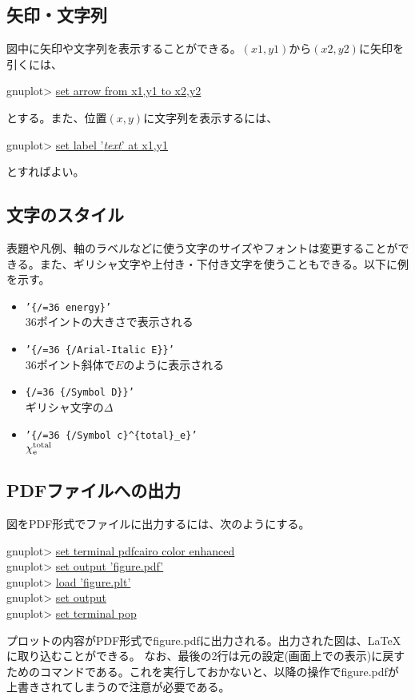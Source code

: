 \subsection{矢印・文字列}

図中に矢印や文字列を表示することができる。\((x1,y1)\)から\((x2,y2)\)に矢印を引くには、
\begin{commandline2}
    gnuplot> \underline{set arrow from x1,y1 to x2,y2}
\end{commandline2} \noindent
とする。また、位置\((x,y)\)に文字列を表示するには、
\begin{commandline2}
    gnuplot> \underline{set label '\textit{text}' at x1,y1}
\end{commandline2} \noindent
とすればよい。

\subsection{文字のスタイル}

表題や凡例、軸のラベルなどに使う文字のサイズやフォントは変更することができる。また、ギリシャ文字や上付き・下付き文字を使うこともできる。以下に例を示す。
\begin{itemize}
    \item \texttt{'\{/=36 energy\}'} \\
          36ポイントの大きさで表示される
    \item \texttt{'\{/=36 \{/Arial-Italic E\}\}'} \\
          36ポイント斜体で\(E\)のように表示される
    \item \texttt{\{/=36 \{/Symbol D\}\}'} \\
          ギリシャ文字の\(\Delta\)
    \item \texttt{'\{/=36 \{/Symbol c\}\^{}\{total\}\_e\}'} \\
          \(\chi^{\rm total}_{\rm e}\)
\end{itemize}

\subsection{PDFファイルへの出力}

図をPDF形式でファイルに出力するには、次のようにする。
\begin{commandline2}
    gnuplot> \underline{set terminal pdfcairo color enhanced} \\
    gnuplot> \underline{set output 'figure.pdf'} \\
    gnuplot> \underline{load 'figure.plt'} \\
    gnuplot> \underline{set output} \\
    gnuplot> \underline{set terminal pop}
\end{commandline2} \noindent
プロットの内容がPDF形式でfigure.pdfに出力される。出力された図は、\LaTeX に取り込むことができる。
なお、最後の2行は元の設定(画面上での表示)に戻すためのコマンドである。これを実行しておかないと、以降の操作でfigure.pdfが上書きされてしまうので注意が必要である。
